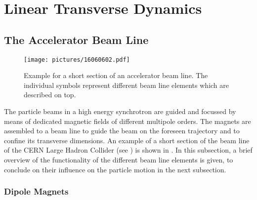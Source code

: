 \section{Linear Transverse Dynamics}

\subsection{The Accelerator Beam Line}

\begin{figure}[htbp]  
    \centering
    \texttt{[image: pictures/16060602.pdf]}
    \caption{Example for a short section of an accelerator beam line. The individual symbols represent different beam line elements which are described on top.}  
    \label{pic:16060601}
\end{figure}

The particle beams in a high energy synchrotron are guided and focussed by means of dedicated magnetic fields of different multipole orders. The magnets are assembled to a beam line  to guide the beam on the foreseen trajectory and to confine its transverse dimensions. An example of a short section of the beam line of the CERN Large Hadron Collider (see ) is shown in . In this subsection, a brief overview of the functionality of the different beam line elements is given, to conclude on their influence on the particle motion in the next subsection.

\subsubsection{Dipole Magnets} 



